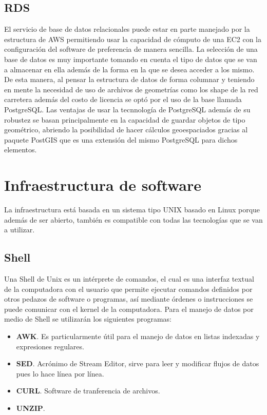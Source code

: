 \subsection{RDS}
El servicio de base de datos relacionales puede estar en parte manejado por la estructura de AWS permitiendo usar la capacidad de cómputo de una EC2 con la configuración del software de preferencia de manera sencilla. La selección de una base de datos es muy importante tomando en cuenta el tipo de datos que se van a almacenar en ella además de la forma en la que se desea acceder a los mismo. De esta manera, al pensar la estructura de datos de forma columnar y teniendo en mente la necesidad de uso de archivos de geometrías como los shape de la red carretera además del costo de licencia se optó por el uso de la base llamada PostgreSQL. Las ventajas de usar la tecnnología de PostgreSQL además de su robustez se basan principalmente en la capacidad de guardar objetos de tipo geométrico, abriendo la posibilidad de hacer cálculos geoespaciados gracias al paquete PostGIS que es una extensión del mismo PostgreSQL para dichos elementos.

\section{Infraestructura de software}
La infraestructura está basada en un sistema tipo UNIX basado en Linux porque además de ser abierto, también es compatible con todas las tecnologías que se van a utilizar.\\
\subsection{Shell}
Una Shell de Unix es un intérprete de comandos, el cual es una interfaz textual de la computadora con el usuario que permite ejecutar comandos definidos por otros pedazos de software o programas, así mediante órdenes o instrucciones se puede comunicar con el kernel de la computadora. Para el manejo de datos por medio de Shell se utilizarán los siguientes programas:
\begin{itemize}
    \item \textbf{AWK}. Es particularmente útil para el manejo de datos en listas indexadas y expresiones regulares.
    \item \textbf{SED}. Acrónimo de Stream Editor, sirve para leer y modificar flujos de datos pues lo hace línea por línea.
    \item \textbf{CURL}. Software de tranferencia de archivos.
    \item \textbf{UNZIP}.
\end{itemize}
